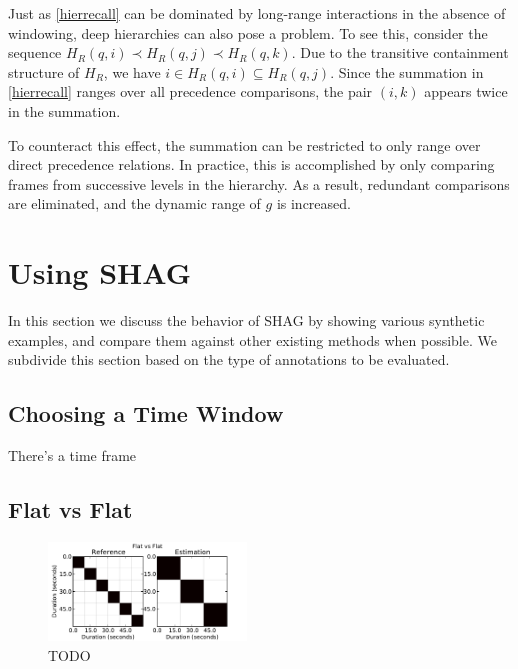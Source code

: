\documentclass{article}
\begin{document}
Just as \cref{hierrecall} can be dominated by long-range interactions in the absence
of windowing, deep hierarchies can also pose a problem.  To see this, consider the 
sequence $H_R(q, i) \prec H_R(q, j) \prec H_R(q, k)$.  Due to the transitive
containment structure of $H_R$, we have $i \in H_R(q, i) \subseteq H_R(q, j)$.
Since the summation in \cref{hierrecall} ranges over all precedence comparisons, the
pair $(i, k)$ appears twice in the summation.  

To counteract this effect, the summation can be restricted to only range over direct
precedence relations.  In practice, this is accomplished by only comparing frames from
successive levels in the hierarchy.  As a result, redundant comparisons are
eliminated, and the dynamic range of $g$ is increased.

\section{Using SHAG}\label{sec:using_method}

In this section we discuss the behavior of SHAG by showing various synthetic examples, and compare them against other existing methods when possible.
We subdivide this section based on the type of annotations to be evaluated.

\subsection{Choosing a Time Window}

There's a time frame 

\subsection{Flat vs Flat}

\begin{figure}
  \centering
  \includegraphics[width=0.47\textwidth]{plots/flat-flat.pdf}
  \caption{TODO}
  \label{fig:flat-flat}
\end{figure}%
\end{document}
